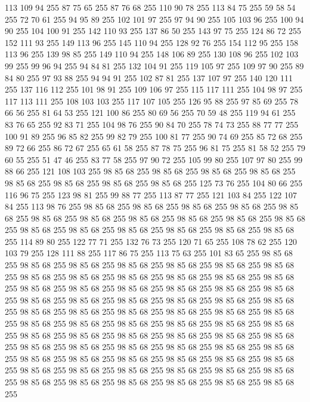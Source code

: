 113 109 94 255 87 75 65 255 87 76 68 255 110 90 78 255 113 84 75 255 59 58 54 255 72 70 61 255 94 95 89 255 102 101 97 255 97 94 90 255 105 103 96 255 100 94 90 255 104 100 91 255 142 110 93 255 137 86 50 255 143 97 75 255 124 86 72 255 152 111 93 255 149 113 96 255 145 110 94 255 128 92 76 255 154 112 95 255 158 113 96 255 139 98 85 255 149 110 94 255 148 106 89 255 130 108 96 255 102 103 99 255 99 96 94 255 94 84 81 255 132 104 91 255 119 105 97 255 109 97 90 255 89 84 80 255 97 93 88 255 94 94 91 255 102 87 81 255 137 107 97 255 140 120 111 255 137 116 112 255 101 98 91 255 109 106 97 255 115 117 111 255 104 98 97 255 117 113 111 255 108 103 103 255 117 107 105 255 126 95 88 255 97 85 69 255 78 66 56 255 81 64 53 255 121 100 86 255 80 69 56 255 70 59 48 255 119 94 61 255 83 76 65 255 92 83 71 255 104 98 76 255 90 84 70 255 78 74 73 255 88 77 77 255 100 91 89 255 96 85 82 255 99 82 79 255
100 81 77 255 90 74 69 255 85 72 68 255 89 72 66 255 86 72 67 255 65 61 58 255 87 78 75 255 96 81 75 255 81 58 52 255 79 60 55 255 51 47 46 255 83 77 58 255 97 90 72 255 105 99 80 255 107 97 80 255 99 88 66 255 121 108 103 255 98 85 68 255 98 85 68 255 98 85 68 255 98 85 68 255 98 85 68 255 98 85 68 255 98 85 68 255 98 85 68 255 125 73 76 255 104 80 66 255 116 96 75 255 123 98 81 255 99 88 77 255 113 87 77 255 121 103 84 255 122 107 84 255 113 98 76 255 98 85 68 255 98 85 68 255 98 85 68 255 98 85 68 255 98 85 68 255 98 85 68 255 98 85 68 255 98 85 68 255 98 85 68 255 98 85 68 255 98 85 68 255 98 85 68 255 98 85 68 255 98 85 68 255 98 85 68 255 98 85 68 255 98 85 68 255 114 89 80 255 122 77 71 255 132 76 73 255 120 71 65 255 108 78 62 255 120 103 79 255 128 111 88 255 117 86 75 255 113 75 63 255 101 83 65 255 98 85 68 255 98 85 68 255 98 85 68 255
98 85 68 255 98 85 68 255 98 85 68 255 98 85 68 255 98 85 68 255 98 85 68 255 98 85 68 255 98 85 68 255 98 85 68 255 98 85 68 255 98 85 68 255 98 85 68 255 98 85 68 255 98 85 68 255 98 85 68 255 98 85 68 255 98 85 68 255 98 85 68 255 98 85 68 255 98 85 68 255 98 85 68 255 98 85 68 255 98 85 68 255 98 85 68 255 98 85 68 255 98 85 68 255 98 85 68 255 98 85 68 255 98 85 68 255 98 85 68 255 98 85 68 255 98 85 68 255 98 85 68 255 98 85 68 255 98 85 68 255 98 85 68 255 98 85 68 255 98 85 68 255 98 85 68 255 98 85 68 255 98 85 68 255 98 85 68 255 98 85 68 255 98 85 68 255 98 85 68 255 98 85 68 255 98 85 68 255 98 85 68 255 98 85 68 255 98 85 68 255 98 85 68 255 98 85 68 255 98 85 68 255 98 85 68 255 98 85 68 255 98 85 68 255 98 85 68 255 98 85 68 255 98 85 68 255 98 85 68 255 98 85 68 255 98 85 68 255 98 85 68 255 98 85 68 255
